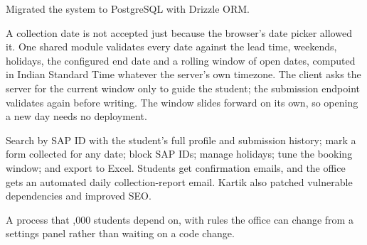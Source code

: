 
\begin{facts}
\end{facts}

 Migrated the system to PostgreSQL with Drizzle ORM.

 A collection date is not accepted just because the browser's date
picker allowed it. One shared module validates every date against the lead time, weekends,
holidays, the configured end date and a rolling window of open dates, computed in Indian Standard
Time whatever the server's own timezone. The client asks the server for the current window only to
guide the student; the submission endpoint validates again before writing. The window slides forward
on its own, so opening a new day needs no deployment.

 Search by SAP ID with the student's full profile and submission history;
mark a form collected for any date; block SAP IDs; manage holidays; tune the booking window; and
export to Excel. Students get confirmation emails, and the office gets an automated daily
collection-report email. Kartik also patched vulnerable dependencies and improved SEO.

 A process that ,000 students depend on, with rules the office can change from a
settings panel rather than waiting on a code change.


